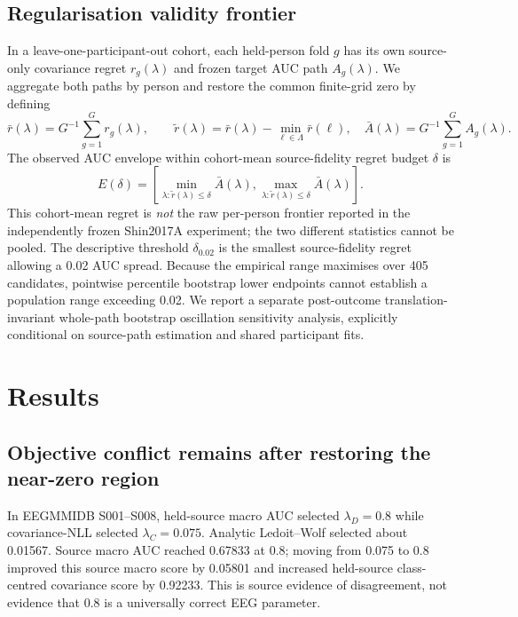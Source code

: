 \documentclass[11pt,a4paper]{article}
\begin{document}


\subsection{Regularisation validity frontier}
In a leave-one-participant-out cohort, each held-person fold \(g\) has
its own source-only covariance regret \(r_g(\lambda)\) and frozen target
AUC path \(A_g(\lambda)\). We aggregate both paths by person and restore
the common finite-grid zero by defining
\[
 \bar r(\lambda)=G^{-1}\sum_{g=1}^{G}r_g(\lambda),\qquad
 \widetilde r(\lambda)=\bar r(\lambda)-\min_{\ell\in\Lambda}\bar r(\ell),
 \quad \bar A(\lambda)=G^{-1}\sum_{g=1}^{G}A_g(\lambda).
\]
The observed AUC envelope within cohort-mean source-fidelity
regret budget \(\delta\) is
\[
 E(\delta)=
 \left[
 \min_{\lambda:\widetilde r(\lambda)\le\delta}\bar A(\lambda),
 \max_{\lambda:\widetilde r(\lambda)\le\delta}\bar A(\lambda)
 \right].
\]
This cohort-mean regret is \emph{not} the raw per-person frontier
reported in the independently frozen Shin2017A experiment; the two
different statistics cannot be pooled.
The descriptive threshold \(\delta_{0.02}\) is the smallest source-fidelity
regret allowing a 0.02 AUC spread. Because the empirical range
maximises over 405 candidates, pointwise percentile bootstrap lower
endpoints cannot establish a population range exceeding 0.02. We report
a separate post-outcome translation-invariant whole-path bootstrap
oscillation sensitivity analysis, explicitly conditional on source-path
estimation and shared participant fits.

\section{Results}
\subsection{Objective conflict remains after restoring the near-zero region}
In EEGMMIDB S001--S008, held-source macro AUC selected
\(\lambda_D=0.8\) while covariance-NLL selected \(\lambda_C=0.075\).
Analytic Ledoit--Wolf selected about 0.01567. Source macro AUC reached
0.67833 at 0.8; moving from 0.075 to 0.8 improved this source macro
score by 0.05801 and increased held-source class-centred covariance score by 0.92233.
This is source evidence of disagreement, not evidence that 0.8 is a
universally correct EEG parameter.
\end{document}
